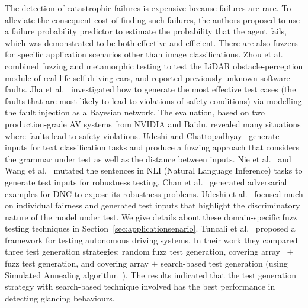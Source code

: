 The detection of catastrophic failures is expensive because failures are rare. 
To alleviate the consequent cost of finding such failures, the authors proposed to use a failure probability predictor to estimate the probability that the agent fails, which was demonstrated to be both effective and efficient.
There are also fuzzers for specific application scenarios other than image classifications.
Zhou et al.~ 
combined fuzzing and metamorphic testing to test the LiDAR obstacle-perception module of real-life self-driving cars, and reported previously unknown software faults.
Jha et al.~ investigated how to generate the most effective test cases (the faults that are most likely to lead to violations of safety conditions) via modelling the fault injection as a Bayesian network. 
The evaluation, based on two production-grade AV systems from NVIDIA and Baidu, revealed many situations where faults lead to safety violations. 
Udeshi and Chattopadhyay~ generate inputs for text classification tasks and produce a fuzzing approach that considers the grammar under test as well as the distance between inputs.
Nie et al.~ and Wang et al.~ mutated the sentences in NLI (Natural Language Inference) tasks to generate test inputs for robustness testing.
Chan et al.~ generated adversarial examples for DNC to expose its robustness problems.
Udeshi et al.~ focused much on individual fairness and generated test inputs that highlight the discriminatory nature of the model under test.
We give details about these domain-specific fuzz testing techniques in Section~\ref{sec:applicationsenario}.
Tuncali et al.~ proposed a framework for testing autonomous driving systems.
In their work they compared three test generation strategies: 
random fuzz test generation,
covering array~ $+$ fuzz test generation,
and covering array $+$ search-based test generation (using Simulated Annealing algorithm~).
The results indicated that the test generation strategy with search-based technique involved has the best performance in detecting glancing behaviours.

